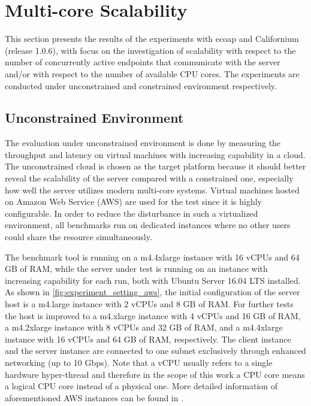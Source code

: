 
\section{Multi-core Scalability} \label{multi_core_scalability}

This section presents the results of the experiments with ecoap and Californium (release 1.0.6), with focus on the investigation of scalability with respect to the number of concurrently active endpoints that communicate with the server and/or with respect to the number of available CPU cores. The experiments are conducted under unconstrained and constrained environment respectively. 

\subsection{Unconstrained Environment}

The evaluation under unconstrained environment is done by measuring the throughput and latency on virtual machines with increasing capability in a cloud. The unconstrained cloud is chosen as the target platform because it should better reveal the scalability of the server compared with a constrained one, especially how well the server utilizes modern multi-core systems. Virtual machines hosted on Amazon Web Service (AWS) are used for the test since it is highly configurable. In order to reduce the disturbance in such a virtualized environment, all benchmarks run on dedicated instances \autocite{aws_dedicated_instance} where no other users could share the resource simultaneously. 

The benchmark tool is running on a m4.4xlarge instance with 16 vCPUs and 64 GB of RAM, while the server under test is running on an instance with increasing capability for each run, both with Ubuntu Server 16.04 LTS installed. As shown in \autoref{fig:experiment_setting_aws}, the initial configuration of the server host is a m4.large instance with 2 vCPUs and 8 GB of RAM. For further tests the host is improved to a m4.xlarge instance with 4 vCPUs and 16 GB of RAM, a m4.2xlarge instance with 8 vCPUs and 32 GB of RAM, and a m4.4xlarge instance with 16 vCPUs and 64 GB of RAM, respectively. The client instance and the server instance are connected to one subnet exclusively through enhanced networking (up to 10 Gbps). Note that a vCPU usually refers to a single hardware hyper-thread and therefore in the scope of this work a CPU core means a logical CPU core instead of a physical one. More detailed information of aforementioned AWS instances can be found in \autocite{aws_instance}.


